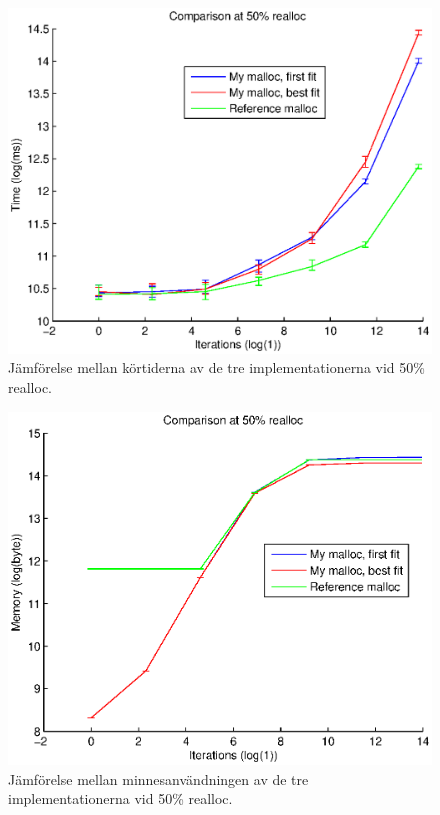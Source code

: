 \documentclass[10pt,a4paper]{article}
\begin{document}
\begin{figure}
\includegraphics[scale=0.7]{../results/comparison.eps}
\caption{Jämförelse mellan körtiderna av de tre implementationerna vid 50\% realloc.}
\label{fig:comparison}
\end{figure}

\begin{figure}
\includegraphics[scale=0.7]{../results/mem_comparison.eps}
\caption{Jämförelse mellan minnesanvändningen av de tre implementationerna vid 50\% realloc.}
\label{fig:mem_comparison}
\end{figure}
\end{document}
